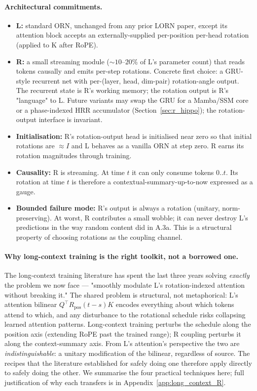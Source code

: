 \documentclass[10pt, twocolumn, a4paper]{article}
\begin{document}
\paragraph{Architectural commitments.}
\begin{itemize}[nosep,leftmargin=1.5em]
\item \textbf{L:} standard ORN, unchanged from any prior LORN paper, except its attention block accepts an externally-supplied per-position per-head rotation (applied to K after RoPE).
\item \textbf{R:} a small streaming module ($\sim 10$--$20\%$ of L's parameter count) that reads tokens causally and emits per-step rotations. Concrete first choice: a GRU-style recurrent net with per-(layer, head, dim-pair) rotation-angle output. The recurrent state is R's working memory; the rotation output is R's "language" to L. Future variants may swap the GRU for a Mamba/SSM core or a phase-indexed HRR accumulator (Section~\ref{sec:r_hippo}); the rotation-output interface is invariant.
\item \textbf{Initialisation:} R's rotation-output head is initialised near zero so that initial rotations are $\approx I$ and L behaves as a vanilla ORN at step zero. R earns its rotation magnitudes through training.
\item \textbf{Causality:} R is streaming. At time $t$ it can only consume tokens $0..t$. Its rotation at time $t$ is therefore a contextual-summary-up-to-now expressed as a gauge.
\item \textbf{Bounded failure mode:} R's output is always a rotation (unitary, norm-preserving). At worst, R contributes a small wobble; it can never destroy L's predictions in the way random content did in A.3a. This is a structural property of choosing rotations as the coupling channel.
\end{itemize}

\paragraph{Why long-context training is the right toolkit, not a borrowed one.}

The long-context training literature has spent the last three years solving \emph{exactly} the problem we now face --- "smoothly modulate L's rotation-indexed attention without breaking it." The shared problem is structural, not metaphorical: L's attention bilinear $Q^\top R_{\text{pos}}(t-s) K$ encodes everything about which tokens attend to which, and any disturbance to the rotational schedule risks collapsing learned attention patterns. Long-context training perturbs the schedule along the position axis (extending RoPE past the trained range); R coupling perturbs it along the context-summary axis. From L's attention's perspective the two are \emph{indistinguishable}: a unitary modification of the bilinear, regardless of source. The recipes that the literature established for safely doing one therefore apply directly to safely doing the other. We summarise the four practical techniques here; full justification of why each transfers is in Appendix~\ref{app:long_context_R}.
\end{document}
